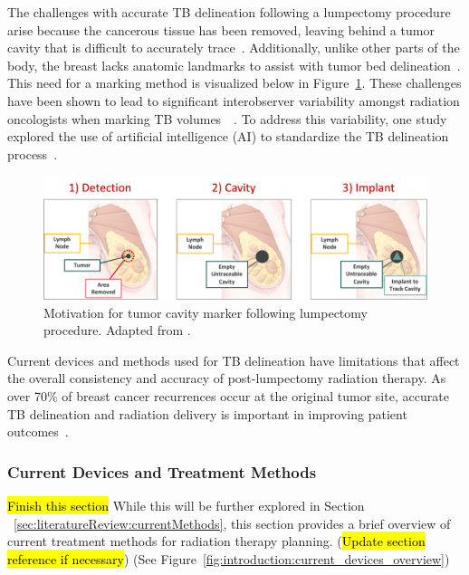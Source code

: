 The challenges with accurate TB delineation following a lumpectomy procedure arise because the cancerous tissue has been removed, leaving behind a tumor cavity that is difficult to accurately trace~\cite{RefWorks:RefID:25-acree2022review}. Additionally, unlike other parts of the body, the breast lacks anatomic landmarks to assist with tumor bed delineation~\cite{RefWorks:RefID:344-mitchell2019adaptable}. This need for a marking method is visualized below in Figure~\ref{fig:introduction:need_for_tumor_bed_marker}. These challenges have been shown to lead to significant interobserver variability amongst radiation oncologists when marking TB volumes~\cite{RefWorks:RefID:191-kader2008ctbased}~\cite{RefWorks:RefID:194-kirby2013tumour}. To address this variability, one study explored the use of artificial intelligence (AI) to standardize the TB delineation process~\cite{RefWorks:RefID:195-poortmans2019winter}.

\begin{figure}[h!]
        \centering
        \includegraphics[width=\linewidth]{../figs/introduction/need_for_tumor_bed_marker.png}
        \caption{Motivation for tumor cavity marker following lumpectomy procedure. Adapted from \cite{RefWorks:RefID:38-johnbreastconserving}.}
        \label{fig:introduction:need_for_tumor_bed_marker}
\end{figure}

Current devices and methods used for TB delineation have limitations that affect the overall consistency and accuracy of post-lumpectomy radiation therapy. As over 70\% of breast cancer recurrences occur at the original tumor site, accurate TB delineation and radiation delivery is important in improving patient outcomes~\cite{RefWorks:RefID:25-acree2022review}.

\subsubsection{Current Devices and Treatment Methods}
\hl{Finish this section}
While this will be further explored in Section ~\ref{sec:literatureReview:currentMethods}, this section provides a brief overview of current treatment methods for radiation therapy planning. (\hl{Update section reference if necessary})
(See Figure~\ref{fig:introduction:current_devices_overview})

